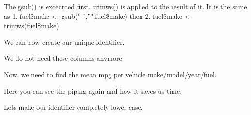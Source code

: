 \documentclass[]{book}
\newenvironment{Shaded}{\begin{snugshade}}{\end{snugshade}}
\newcommand{\CommentTok}[1]{\textcolor[rgb]{0.56,0.35,0.01}{\textit{#1}}}
\newcommand{\DataTypeTok}[1]{\textcolor[rgb]{0.13,0.29,0.53}{#1}}
\newcommand{\KeywordTok}[1]{\textcolor[rgb]{0.13,0.29,0.53}{\textbf{#1}}}
\newcommand{\NormalTok}[1]{#1}
\newcommand{\OperatorTok}[1]{\textcolor[rgb]{0.81,0.36,0.00}{\textbf{#1}}}
\newcommand{\StringTok}[1]{\textcolor[rgb]{0.31,0.60,0.02}{#1}}
\begin{document}
The gsub() is excecuted first. trimws() is applied to the result of it. It is the same as 1. fuel\$make \textless{}- gsub(" ``,''",fuel\$make) then 2. fuel\$make \textless{}- trimws(fuel\$make)

We can now create our unique identifier.

\begin{Shaded}
\end{Shaded}

We do not need these columns anymore.

\begin{Shaded}
\end{Shaded}

Now, we need to find the mean mpg per vehicle make/model/year/fuel.

\begin{Shaded}
\end{Shaded}

Here you can see the piping again and how it saves us time.

Lets make our identifier completely lower case.

\begin{Shaded}
\end{Shaded}
\end{document}
